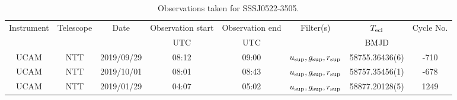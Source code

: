 \begin{table}
	\begin{center}
		\begin{tabular}{cccccccc}
			\hline
			Instrument & Telescope & Date & Observation start & Observation end & Filter(s) & $T_{\rm ecl}$ & Cycle No. \\
			 &  &  & UTC & UTC &  & BMJD &  \\
			\hline
			\hline
			UCAM & NTT & 2019/09/29 & 08:12    & 09:00    & $u_{\rm sup},g_{\rm sup},r_{\rm sup}$ & 58755.36436(6)                                                                                                           &                                        -710 \\
			UCAM & NTT & 2019/10/01 & 08:01    & 08:43    & $u_{\rm sup},g_{\rm sup},r_{\rm sup}$ & 58757.35456(1)                                                                                                            &                                        -678 \\
			UCAM & NTT & 2019/01/29 & 04:07    & 05:02    & $u_{\rm sup},g_{\rm sup},r_{\rm sup}$ & 58877.20128(5)                                                                                                            &                                        1249 \\
		   \hline
		\end{tabular}
	\end{center}
	\caption{Observations taken for SSSJ0522-3505.}
	\label{table:observing:observation logs SSSJ0522-3505}
\end{table}